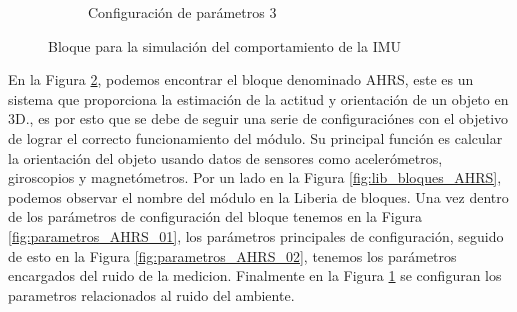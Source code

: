 \begin{figure}[htbp]
\begin{subfigure}[b]{0.45\textwidth}
        \caption{Configuración de parámetros 3}
        \label{fig:parametros_AHRS_03}
    \end{subfigure}

    \caption{Bloque para la simulación del comportamiento de la IMU}
    \label{fig:arreglo_AHRS}
\end{figure}

En la Figura \ref{fig:arreglo_AHRS}, podemos encontrar el bloque denominado AHRS, este es un sistema que proporciona la estimación de la actitud y orientación de un objeto en 3D., es por esto que se debe de seguir una serie de configuraciónes con el objetivo de lograr el correcto funcionamiento del módulo. Su principal función es calcular la orientación del objeto usando datos de sensores como acelerómetros, giroscopios y magnetómetros. Por un lado en la Figura \ref{fig:lib_bloques_AHRS}, podemos observar el nombre del módulo en la Liberia de bloques. Una vez dentro de los parámetros de configuración del bloque tenemos en la Figura \ref{fig:parametros_AHRS_01}, los parámetros principales de configuración, seguido de esto en la Figura \ref{fig:parametros_AHRS_02}, tenemos los parámetros encargados del ruido de la medicion. Finalmente en la Figura \ref{fig:parametros_AHRS_03} se configuran los parametros relacionados al ruido del ambiente. 

